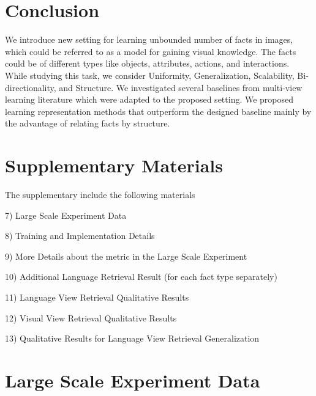 \documentclass[runningheads]{llncs}
\begin{document}
\section{Conclusion}


We introduce new setting  for learning unbounded number of facts in images, which could be referred to as a model for gaining visual knowledge. The facts could be of different types like objects, attributes, actions, and interactions.  While studying this task, we consider  Uniformity, Generalization, Scalability, Bi-directionality, and Structure. We investigated several baselines from multi-view learning literature which were adapted to the proposed setting. We proposed learning representation methods that outperform the designed baseline mainly by the advantage of relating facts by structure.




\clearpage






\clearpage
\section*{Supplementary Materials}


The supplementary include the following materials




7) Large Scale Experiment Data




8) Training and Implementation Details






9) More Details about the metric in the Large Scale Experiment




10) Additional Language Retrieval Result (for each fact type separately)


11) Language View Retrieval Qualitative Results




12) Visual View Retrieval Qualitative Results


13) Qualitative Results for Language View Retrieval Generalization


\section{Large Scale Experiment Data}
\label{app:lsc_data}
\end{document}
